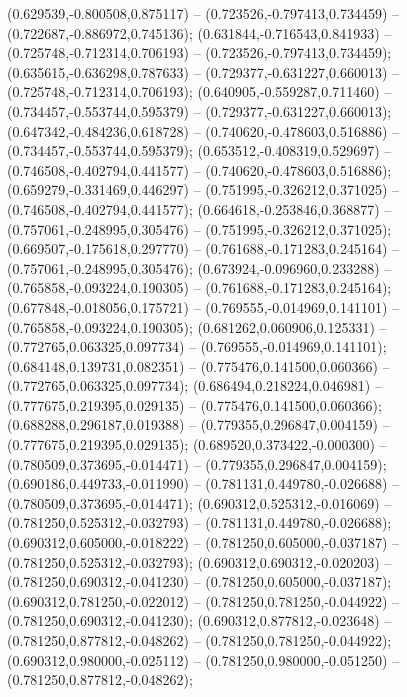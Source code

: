  (0.629539,-0.800508,0.875117) -- (0.723526,-0.797413,0.734459) -- (0.722687,-0.886972,0.745136);
 (0.631844,-0.716543,0.841933) -- (0.725748,-0.712314,0.706193) -- (0.723526,-0.797413,0.734459);
 (0.635615,-0.636298,0.787633) -- (0.729377,-0.631227,0.660013) -- (0.725748,-0.712314,0.706193);
 (0.640905,-0.559287,0.711460) -- (0.734457,-0.553744,0.595379) -- (0.729377,-0.631227,0.660013);
 (0.647342,-0.484236,0.618728) -- (0.740620,-0.478603,0.516886) -- (0.734457,-0.553744,0.595379);
 (0.653512,-0.408319,0.529697) -- (0.746508,-0.402794,0.441577) -- (0.740620,-0.478603,0.516886);
 (0.659279,-0.331469,0.446297) -- (0.751995,-0.326212,0.371025) -- (0.746508,-0.402794,0.441577);
 (0.664618,-0.253846,0.368877) -- (0.757061,-0.248995,0.305476) -- (0.751995,-0.326212,0.371025);
 (0.669507,-0.175618,0.297770) -- (0.761688,-0.171283,0.245164) -- (0.757061,-0.248995,0.305476);
 (0.673924,-0.096960,0.233288) -- (0.765858,-0.093224,0.190305) -- (0.761688,-0.171283,0.245164);
 (0.677848,-0.018056,0.175721) -- (0.769555,-0.014969,0.141101) -- (0.765858,-0.093224,0.190305);
 (0.681262,0.060906,0.125331) -- (0.772765,0.063325,0.097734) -- (0.769555,-0.014969,0.141101);
 (0.684148,0.139731,0.082351) -- (0.775476,0.141500,0.060366) -- (0.772765,0.063325,0.097734);
 (0.686494,0.218224,0.046981) -- (0.777675,0.219395,0.029135) -- (0.775476,0.141500,0.060366);
 (0.688288,0.296187,0.019388) -- (0.779355,0.296847,0.004159) -- (0.777675,0.219395,0.029135);
 (0.689520,0.373422,-0.000300) -- (0.780509,0.373695,-0.014471) -- (0.779355,0.296847,0.004159);
 (0.690186,0.449733,-0.011990) -- (0.781131,0.449780,-0.026688) -- (0.780509,0.373695,-0.014471);
 (0.690312,0.525312,-0.016069) -- (0.781250,0.525312,-0.032793) -- (0.781131,0.449780,-0.026688);
 (0.690312,0.605000,-0.018222) -- (0.781250,0.605000,-0.037187) -- (0.781250,0.525312,-0.032793);
 (0.690312,0.690312,-0.020203) -- (0.781250,0.690312,-0.041230) -- (0.781250,0.605000,-0.037187);
 (0.690312,0.781250,-0.022012) -- (0.781250,0.781250,-0.044922) -- (0.781250,0.690312,-0.041230);
 (0.690312,0.877812,-0.023648) -- (0.781250,0.877812,-0.048262) -- (0.781250,0.781250,-0.044922);
 (0.690312,0.980000,-0.025112) -- (0.781250,0.980000,-0.051250) -- (0.781250,0.877812,-0.048262);
